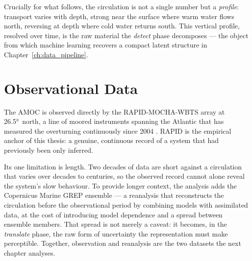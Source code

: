 Crucially for what follows, the circulation is not a single number but a \emph{profile}: transport varies with depth, strong near the surface where warm water flows north, reversing at depth where cold water returns south. This vertical profile, resolved over time, is the raw material the \emph{detect} phase decomposes --- the object from which machine learning recovers a compact latent structure in Chapter~\ref{ch:data_pipeline}.

\section{Observational Data}
\label{sec:bg-data}

The AMOC is observed directly by the RAPID-MOCHA-WBTS array at \ang{26.5}~north, a line of moored instruments spanning the Atlantic that has measured the overturning continuously since 2004 \citep{frajkawilliams2021, moat2026}. RAPID is the empirical anchor of this thesis: a genuine, continuous record of a system that had previously been only inferred.

Its one limitation is length. Two decades of data are short against a circulation that varies over decades to centuries, so the observed record cannot alone reveal the system's slow behaviour. To provide longer context, the analysis adds the Copernicus Marine GREP ensemble --- a reanalysis that reconstructs the circulation before the observational period by combining models with assimilated data, at the cost of introducing model dependence and a spread between ensemble members. That spread is not merely a caveat: it becomes, in the \emph{translate} phase, the raw form of uncertainty the representation must make perceptible. Together, observation and reanalysis are the two datasets the next chapter analyses.